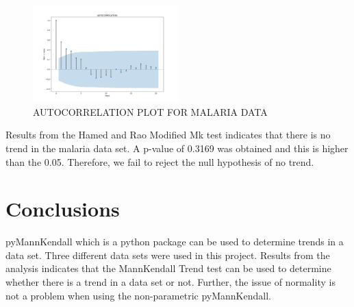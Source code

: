 \documentclass[12pt, letterpaper, twoside]{article}
\begin{document}
\begin{figure}
	    \centering
	        \includegraphics[width=0.5\textwidth]{MALARIA_DATA_ACF_PLOT.png}
		    \caption{AUTOCORRELATION PLOT FOR MALARIA DATA}
		        \label{fig:3}
\end{figure}

Results from the Hamed and Rao Modified Mk test indicates that there is no trend in the malaria data set. A p-value of 0.3169 was obtained and this is higher than the 0.05. Therefore, we fail to reject the null hypothesis of no trend. 
\section{Conclusions}
pyMannKendall which is a python package can be used to determine trends in a data set. Three different data sets were used in this project. Results from the analysis indicates that the MannKendall Trend test can be used to determine whether there is a trend in a data set or not. Further, the issue of normality is not a problem when using the non-parametric pyMannKendall. 
\end{document}
